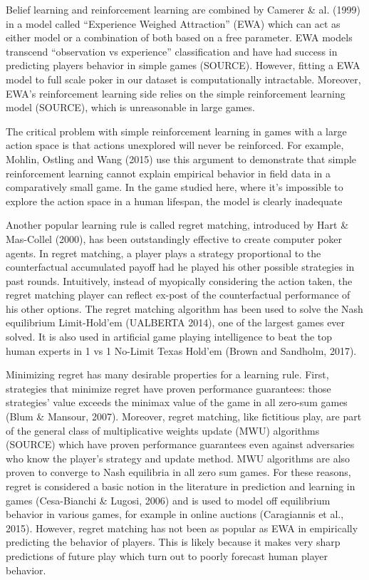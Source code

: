 \documentclass[12pt]{article}
\begin{document}
Belief learning and reinforcement learning are combined by Camerer \& al. (1999) in a model called “Experience Weighed Attraction” (EWA) which can act as either model or a combination of both based on a free parameter. EWA models transcend “observation vs experience” classification and have had success in predicting players behavior in simple games (SOURCE). However, fitting a EWA model to full scale poker in our dataset is computationally intractable. Moreover, EWA’s reinforcement learning side relies on the simple reinforcement learning model (SOURCE), which is unreasonable in large games.

The critical problem with simple reinforcement learning in games with a large action space is that actions unexplored will never be reinforced. For example, Mohlin, Ostling and Wang (2015) use this argument to demonstrate that simple reinforcement learning cannot explain empirical behavior in field data in a comparatively small game. In the game studied here, where it’s impossible to explore the action space in a human lifespan, the model is clearly inadequate

Another popular learning rule is called regret matching, introduced by Hart \& Mas-Collel (2000), has been outstandingly effective to create computer poker agents. In regret matching, a player plays a strategy proportional to the counterfactual accumulated payoff had he played his other possible strategies in past rounds. Intuitively, instead of myopically considering the action taken, the regret matching player can reflect ex-post of the counterfactual performance of his other options. The regret matching algorithm has been used to solve the Nash equilibrium Limit-Hold’em (UALBERTA 2014), one of the largest games ever solved. It is also used in artificial game playing intelligence to beat the top human experts in 1 vs 1 No-Limit Texas Hold’em (Brown and Sandholm, 2017).

Minimizing regret has many desirable properties for a learning rule. First, strategies that minimize regret have proven performance guarantees:  those strategies’ value exceeds the minimax value of the game in all zero-sum games (Blum \& Mansour, 2007). Moreover, regret matching, like fictitious play, are part of the general class of multiplicative weights update (MWU) algorithms (SOURCE) which have proven performance guarantees even against adversaries who know the player’s strategy and update method. MWU algorithms are also proven to converge to Nash equilibria in all zero sum games. For these reasons, regret is considered a basic notion in the literature in prediction and learning in games (Cesa-Bianchi \& Lugosi, 2006) and is used to model off equilibrium behavior in various games, for example in online auctions (Caragiannis et al., 2015). However, regret matching has not been as popular as EWA in empirically predicting the behavior of players. This is likely because it makes very sharp predictions of future play which turn out to poorly forecast human player behavior.
\end{document}

